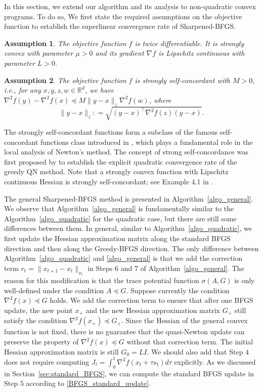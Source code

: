 \documentclass[11pt]{article}
\newtheorem{assumption}{Assumption}
\numberwithin{assumption}{section}
\numberwithin{remark}{section}
\numberwithin{theorem}{section}
\begin{document}
In this section, we extend our algorithm and its analysis to non-quadratic convex programs. To do so, We first state the required assumptions on the objective function to establish the superlinear convergence rate of Sharpened-BFGS.

\begin{assumption}\label{ass_str_cvx_smooth}
The objective function $f$ is twice differentiable. It is strongly convex with parameter $\mu > 0$ and its gradient $\nabla f$ is Lipschitz continuous with parameter $L > 0$.
\end{assumption}

\begin{assumption}\label{ass_str_concordant}
The objective function $f$ is strongly self-concordant with $M > 0$, i.e., for any $ x, y, z, w \in \mathbb{R}^{d}$, we have $\nabla^{2}{f(y)} - \nabla^{2}{f(x)} \preceq M\|y - x\|_{z}\nabla^{2}{f(w)}$, where 
$$
\|y - x\|_{z} : = \sqrt{(y - x)^\top \nabla^2{f(z)} (y - x)}.
$$
\end{assumption}

The strongly self-concordant functions form a subclass of the famous self-concordant functions class introduced in \citep{nesterov1989self,nesterov1994interior}, which plays a fundamental role in the local analysis of Newton's method. The concept of strong self-concordance was first proposed by \citet{rodomanov2020greedy} to establish the explicit quadratic convergence rate of the greedy QN method. Note that a strongly convex function with Lipschitz continuous Hessian is strongly self-concordant; see Example 4.1 in \cite{rodomanov2020greedy}. 

The general Sharpened-BFGS method is presented in Algorithm~\ref{algo_general}. We observe that Algorithm~\ref{algo_general} is fundamentally similar to the Algorithm~\ref{algo_quadratic} for the quadratic case, but there are still some differences between them. In general, similar to Algorithm~\ref{algo_quadratic}, we first update the Hessian approximation matrix along the standard BFGS direction and then along the Greedy-BFGS direction. The only difference between Algorithm~\ref{algo_quadratic} and \ref{algo_general} is that we add the correction term $r_t = \|x_{t + 1} - x_{t}\|_{x_t}$ in Steps $6$ and $7$ of Algorithm~\ref{algo_general}. The reason for this modification is that the trace potential function $\sigma(A, G)$ is only well-defined under the condition $A \preceq G$. Suppose currently the condition $\nabla^2{f(x)} \preceq G$ holds. We add the correction term to ensure that after one BFGS update, the new point $x_+$ and the new Hessian approximation matrix $G_+$ still satisfy the condition $\nabla^2{f(x_+)} \preceq G_+$. Since the Hessian of the general convex function is not fixed, there is no guarantee that the quasi-Newton update can preserve the property of $\nabla^2{f(x)} \preceq G$ without that correction term. The initial Hessian approximation matrix is still $G_0 = LI$. We should also add that Step $4$ does not require computing $J_t = \int_{0}^{1}\nabla^2{f(x_t + \tau s_t)}d\tau$ explicitly. As we discussed in Section~\ref{sec:standard_BFGS}, we can compute the standard BFGS update in Step $5$ according to \eqref{BFGS_standard_update}.
\end{document}
